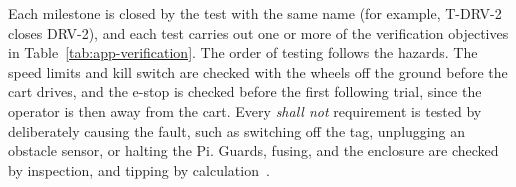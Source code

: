 \label{sec:testing}

\label{sec:vv-strategy}

Each milestone is closed by the test with the same name (for example, \mbox{T-DRV-2} closes DRV-2), and each test carries out one or more of the verification objectives in Table~\ref{tab:app-verification}. The order of testing follows the hazards. The speed limits and kill switch are checked with the wheels off the ground before the cart drives, and the e-stop is checked before the first following trial, since the operator is then away from the cart. Every \emph{shall not} requirement is tested by deliberately causing the fault, such as switching off the tag, unplugging an obstacle sensor, or halting the Pi. Guards, fusing, and the enclosure are checked by inspection, and tipping by calculation~\cite[\S 5.3]{nasaHandbook}.

